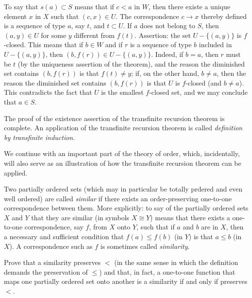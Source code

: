 To say that $s(a) \subset S$ means that if $c < a$ in $W$, then there existe a unique element $x$ in $X$ such that $(c, x) \in U$. The correspondence $c \rightarrow x$ thereby defined is a sequence of type $a$, say $t$, and $t \subset U$. If $a$ does not belong to $S$, then $(a,y) \in U$ for some $y$ different from $f(t)$. Assertion: the set $U - \{ (a, y) \}$ is $f$-closed. This means that if $b \in W$ and if $r$ is a sequence of type $b$ included in $U - \{ (a, y) \}$, then $(b,f(r)) \in U - \{ (a, y) \}$. Indeed, if $b =a$, then $r$ must be $t$ (by the uniqueness assertion of the theorem), and the reason the diminished set contains $(b, f(r))$ is that $f(t) \neq y$; if, on the other hand, $b \neq a$, then the reason the diminished set contains $(b,f(r))$ is that $U$ is $f$-closed (and $b \neq a$). This contradicts the fact that $U$ is the smallest $f$-closed set, and we may conclude that $a \in S$. 

The proof of the existence assertion of the transfinite recursion theorem is complete. An application of the transfinite recursion theorem is called \textit{definition by transfinite induction}. 

We continue with an important part of the theory of order, which, incidentally, will also serve as an illustration of how the transfinite recursion theorem can be applied. 

Two partially ordered sets (which may in particular be totally prdered and even well ordered) are called \textit{similar} if there exists an order-preserving one-to-one correspondence between them. More explicitly: to say of the partially ordered sets $X$ and $Y$ that they are similar (in symbols $X \cong Y$) means that there exists a one-to-one correspondence, say $f$, from $X$ onto $Y$, such that if $a$ and $b$ are in $X$, then a necessary and sufficient condition that $f(a) \le f(b)$ (in $Y$) is that $a \le b$ (in $X$). A correspondence such as $f$ is sometimes called \textit{similarity}. 

\begin{exercise} Prove that a similarity preserves $<$ (in the same sense in which the definition demands the preservation of $\le$) and that, in fact, a one-to-one function that maps one partially ordered set onto another is a similarity if and only if preserves $<$.
\end{exercise}


